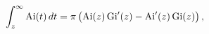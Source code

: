 \[\int_{z}^{\infty}\mathop{\mathrm{Ai}\/}\nolimits\!\left(t\right)dt=\pi\left(%
\mathop{\mathrm{Ai}\/}\nolimits\!\left(z\right)\mathop{\mathrm{Gi}\/}\nolimits%
'\!\left(z\right)-\mathop{\mathrm{Ai}\/}\nolimits'\!\left(z\right)\mathop{%
\mathrm{Gi}\/}\nolimits\!\left(z\right)\right),\]